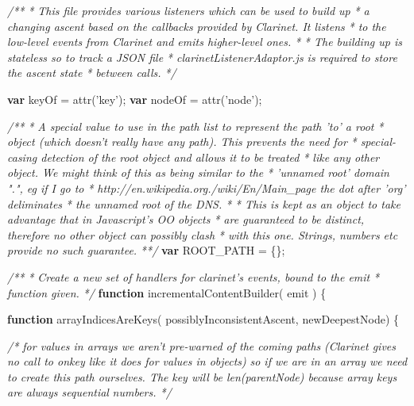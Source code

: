 \documentclass[]{article}
\newenvironment{Shaded}{}{}
\newcommand{\KeywordTok}[1]{\textcolor[rgb]{0.00,0.44,0.13}{\textbf{{#1}}}}
\newcommand{\StringTok}[1]{\textcolor[rgb]{0.25,0.44,0.63}{{#1}}}
\newcommand{\CommentTok}[1]{\textcolor[rgb]{0.38,0.63,0.69}{\textit{{#1}}}}
\newcommand{\FunctionTok}[1]{\textcolor[rgb]{0.02,0.16,0.49}{{#1}}}
\newcommand{\NormalTok}[1]{{#1}}
\begin{document}
\begin{Shaded}
\begin{Highlighting}[]
\CommentTok{/** }
\CommentTok{ * This file provides various listeners which can be used to build up}
\CommentTok{ * a changing ascent based on the callbacks provided by Clarinet. It listens}
\CommentTok{ * to the low-level events from Clarinet and emits higher-level ones.}
\CommentTok{ *  }
\CommentTok{ * The building up is stateless so to track a JSON file}
\CommentTok{ * clarinetListenerAdaptor.js is required to store the ascent state}
\CommentTok{ * between calls.}
\CommentTok{ */}


\KeywordTok{var} \NormalTok{keyOf = }\FunctionTok{attr}\NormalTok{(}\StringTok{'key'}\NormalTok{);}
\KeywordTok{var} \NormalTok{nodeOf = }\FunctionTok{attr}\NormalTok{(}\StringTok{'node'}\NormalTok{);}


\CommentTok{/** }
\CommentTok{ * A special value to use in the path list to represent the path 'to' a root }
\CommentTok{ * object (which doesn't really have any path). This prevents the need for }
\CommentTok{ * special-casing detection of the root object and allows it to be treated }
\CommentTok{ * like any other object. We might think of this as being similar to the }
\CommentTok{ * 'unnamed root' domain ".", eg if I go to }
\CommentTok{ * http://en.wikipedia.org./wiki/En/Main_page the dot after 'org' deliminates }
\CommentTok{ * the unnamed root of the DNS.}
\CommentTok{ * }
\CommentTok{ * This is kept as an object to take advantage that in Javascript's OO objects }
\CommentTok{ * are guaranteed to be distinct, therefore no other object can possibly clash }
\CommentTok{ * with this one. Strings, numbers etc provide no such guarantee. }
\CommentTok{ **/}
\KeywordTok{var} \NormalTok{ROOT_PATH = \{\};}


\CommentTok{/**}
\CommentTok{ * Create a new set of handlers for clarinet's events, bound to the emit }
\CommentTok{ * function given.  }
\CommentTok{ */} 
\KeywordTok{function} \FunctionTok{incrementalContentBuilder}\NormalTok{( emit ) \{}


   \KeywordTok{function} \FunctionTok{arrayIndicesAreKeys}\NormalTok{( possiblyInconsistentAscent, newDeepestNode) \{}
   
      \CommentTok{/* for values in arrays we aren't pre-warned of the coming paths }
\CommentTok{         (Clarinet gives no call to onkey like it does for values in objects) }
\CommentTok{         so if we are in an array we need to create this path ourselves. The }
\CommentTok{         key will be len(parentNode) because array keys are always sequential }
\CommentTok{         numbers. */}


\end{Highlighting}
\end{Shaded}
\end{document}
